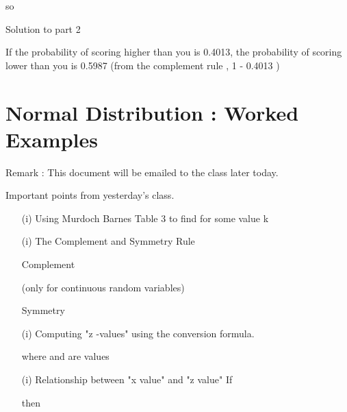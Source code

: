 \documentclass[]{report}
\begin{document}
so  


Solution to part 2

If  the probability of scoring higher than you is 0.4013, the probability of scoring lower than you is 0.5987  
(from the complement rule , 1 - 0.4013 )


\newpage
\section{Normal Distribution : Worked Examples}

Remark : This document will be emailed to the class later today.


Important points from yesterday's class.

\begin{itemize}

\item[(i)] Using Murdoch Barnes Table 3 to find   for some value k

\item[(i)] The Complement and Symmetry Rule

Complement   

(only for continuous random variables)

Symmetry   

\item[(i)] Computing "z -values" using the conversion formula.



where   and   are values
\item[(i)] Relationship between "x value" and "z  value"
If    

then  

\end{itemize}
\end{document}
